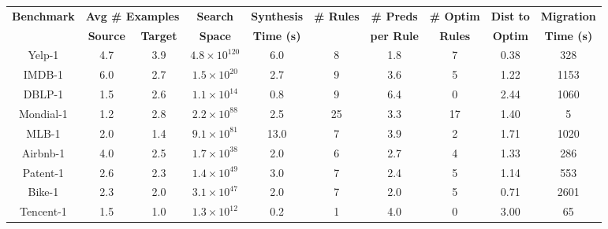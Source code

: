 \documentclass[]{article}
\begin{document}
                \begin{table}
                    \centering
                    \begin{adjustbox}{width=1\textwidth}
                    \small
                    \begin{tabular}{|c|c|c|c|c|c|c|c|c|c|}
                    \hline
                    \multirow{2}{*}{\textbf{\!\!Benchmark\!\!}} &
                    \multicolumn{2}{c|}{\!\textbf{Avg \# Examples}\!} &
                    \textbf{Search} &
                    \!\!\textbf{Synthesis}\!\! &
                    \multirow{2}{*}{\textbf{\# Rules}} &
                    \textbf{\# Preds} &
                    \textbf{\# Optim} &
                    \textbf{Dist to} &
                    \!\!\textbf{Migration}\!\! \\
                    \cline{2-3}
                    & \textbf{Source} & \textbf{Target} & \textbf{Space} & \textbf{Time (s)} & & \textbf{per Rule} & \textbf{Rules} & \textbf{Optim} & \textbf{Time (s)} \\
                    \hline
                    Yelp-1 & 4.7 & 3.9 & $4.8 \times 10^{120}$ & 6.0 & 8 & 1.8 & 7 & 0.38 & 328 \\
                    \hline
                    IMDB-1 & 6.0 & 2.7 & $1.5 \times 10^{20}$ & 2.7 & 9 & 3.6 & 5 & 1.22 & 1153 \\
                    \hline
                    DBLP-1 & 1.5 & 2.6 & $1.1 \times 10^{14}$ & 0.8 & 9 & 6.4 & 0 & 2.44 & 1060 \\
                    \hline
                    Mondial-1 & 1.2 & 2.8 & $2.2 \times 10^{88}$ & 2.5 & 25 & 3.3 & 17 & 1.40 & 5 \\
                    \hline
                    MLB-1 & 2.0 & 1.4 & $9.1 \times 10^{81}$ & 13.0 & 7 & 3.9 & 2 & 1.71 & 1020 \\
                    \hline
                    Airbnb-1 & 4.0 & 2.5 & $1.7 \times 10^{38}$ & 2.0 & 6 & 2.7 & 4 & 1.33 & 286 \\
                    \hline
                    Patent-1 & 2.6 & 2.3 & $1.4 \times 10^{49}$ & 3.0 & 7 & 2.4 & 5 & 1.14 & 553 \\
                    \hline
                    Bike-1 & 2.3 & 2.0 & $3.1 \times 10^{47}$ & 2.0 & 7 & 2.0 & 5 & 0.71 & 2601 \\
                    \hline
                    Tencent-1 & 1.5 & 1.0 & $1.3 \times 10^{12}$ & 0.2 & 1 & 4.0 & 0 & 3.00 & 65 \\
                    \hline

\end{tabular}
\end{adjustbox}
\end{table}
\end{document}
